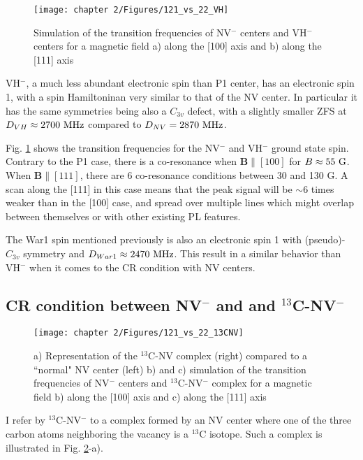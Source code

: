 \documentclass[a4paper,11pt]{report}
\begin{document}
\begin{refsection}
\begin{figure}[h]
\centering
\texttt{[image: chapter 2/Figures/121\_vs\_22\_VH]}
\caption{Simulation of the transition frequencies of NV$^-$ centers and VH$^-$ centers for a magnetic field a) along the [100] axis and b) along the [111] axis}
\label{121 vs 22 VH}
\end{figure}

VH$^-$, a much less abundant electronic spin than P1 center, has an electronic spin 1, with a spin Hamiltoninan very similar to that of the NV center. In particular it has the same symmetries being also a $C_{3v}$ defect, with a slightly smaller ZFS at $D_{VH} \approx 2700\ \rm MHz$ compared to $D_{NV}=2870\ \rm MHz$. 

Fig. \ref{121 vs 22 VH} shows the transition frequencies for the NV$^-$ and VH$^-$ ground state spin. Contrary to the P1 case, there is a co-resonance when $\mathbf{B} \parallel [100]$ for $B\approx 55\ \rm G$. When $\mathbf{B} \parallel [111]$, there are 6 co-resonance conditions between 30 and 130 G. A scan along the [111] in this case means that the peak signal will be $\sim 6$ times weaker than in the [100] case, and spread over multiple lines which might overlap between themselves or with other existing PL features.

The War1 spin mentioned previously is also an electronic spin 1 with (pseudo)-$C_{3v}$ symmetry and $D_{War1} \approx 2470\ \rm MHz$. This result in a similar behavior than VH$^-$ when it comes to the CR condition with NV centers.

\subsection{CR condition between NV$^-$ and and $^{13}$C-NV$^-$}

\begin{figure}[h]
\centering
\texttt{[image: chapter 2/Figures/121\_vs\_22\_13CNV]}
\caption{a) Representation of the $^{13}$C-NV complex (right) compared to a ``normal" NV center (left) b) and c) simulation of the transition frequencies of NV$^-$ centers and $^{13}$C-NV$^-$ complex for a magnetic field b) along the [100] axis and c) along the [111] axis}
\label{121 vs 22 13C-NV}
\end{figure}

I refer by $^{13}$C-NV$^-$ to a complex formed by an NV center where one of the three carbon atoms neighboring the vacancy is a $^{13}$C isotope. Such a complex is illustrated in Fig. \ref{121 vs 22 13C-NV}-a).


\end{refsection}
\end{document}
